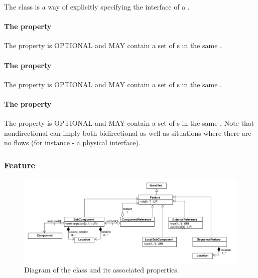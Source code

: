 The  class is a way of explicitly specifying the interface of a . 

\paragraph{The  property}
\label{sec:input:Interface}
The  property is OPTIONAL and MAY contain a set of  s in the same .
\paragraph{The  property}
\label{sec:output:Interface}
The  property is OPTIONAL and MAY contain a set of  s in the same .

\paragraph{The  property}
\label{sec:nondirectional:Interface}
The  property is OPTIONAL and MAY contain a set of  s in the same . Note that nondirectional can imply both bidirectional as well as situations where there are no flows (for instance - a physical interface).


\subsubsection{Feature}
\label{sec:Feature}

\begin{figure}[ht]
\begin{center}
\includegraphics[width=\textwidth]{uml/feature}
\caption[]{Diagram of the  class and its associated properties.}
\label{uml:subcomponent}
\end{center}
\end{figure}

